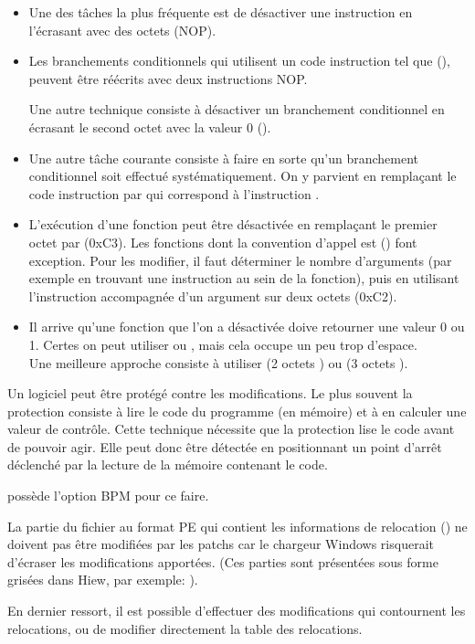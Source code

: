\begin{itemize}

\item Une des tâches la plus fréquente est de désactiver une instruction en l'écrasant
avec des octets  (\ac{NOP}).

\item Les branchements conditionnels qui utilisent un code instruction tel que  (\JZ), 
peuvent être réécrits avec deux instructions \ac{NOP}.

Une autre technique consiste à désactiver un branchement conditionnel en écrasant le second octet 
avec la valeur 0 ().

\item 
Une autre tâche courante consiste à faire en sorte qu'un branchement conditionnel soit effectué 
systématiquement. On y parvient en remplaçant le code instruction par  qui correspond à 
l'instruction \JMP.

\item L'exécution d'une fonction peut être désactivée en remplaçant le premier octet par \RETN (0xC3).
Les fonctions dont la convention d'appel est  () font exception. 
Pour les modifier, il faut déterminer le nombre d'arguments (par exemple en trouvant une instruction 
\RETN au sein de la fonction), puis en utilisant l'instruction \RETN accompagnée d'un argument sur 
deux octets (0xC2).

\item Il arrive qu'une fonction que l'on a désactivée doive retourner une valeur 0 ou 1. Certes on 
peut utiliser  ou , mais cela occupe un peu trop d'espace.\\
Une meilleure approche consiste à utiliser  (2 octets ) ou 
 (3 octets ).

\end{itemize}

Un logiciel peut être protégé contre les modifications. Le plus souvent la protection consiste à 
lire le code du programme (en mémoire) et à en calculer une valeur de contrôle.
Cette technique nécessite que la protection lise le code avant de pouvoir agir. Elle peut donc être 
détectée en positionnant un point d'arrêt déclenché par la lecture de la mémoire contenant le code.

\tracer possède l'option BPM pour ce faire.

La partie du fichier au format PE qui contient les informations de relocation () 
ne doivent pas être modifiées par les patchs car le chargeur Windows risquerait d'écraser les 
modifications apportées.
(Ces parties sont présentées sous forme grisées dans Hiew, par exemple:
).

En dernier ressort, il est possible d'effectuer des modifications qui contournent les relocations, 
ou de modifier directement la table des relocations.
